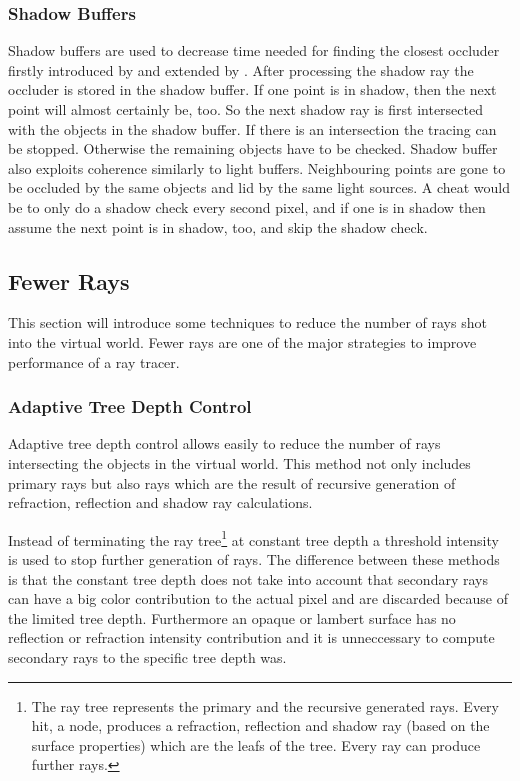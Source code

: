 \documentclass[DIV10, abstracton, openright, footsepline, headsepline, twoside, 9pt,
bigheadings]{scrreprt}
\begin{document}
\subsubsection{Shadow Buffers}
Shadow buffers are used to decrease time needed for finding the closest
occluder firstly introduced by \cite{light-buffer} and extended by
\cite{shadow-buffer}. After processing the  shadow ray the occluder is stored in
the shadow buffer.
If one point is in shadow, then the next point will almost certainly be,
too. So the next shadow ray is first intersected with the objects in the shadow
buffer. If there is an intersection the tracing can be stopped. Otherwise the
remaining objects have to be checked. Shadow buffer also exploits coherence
similarly to light buffers. Neighbouring points are gone to be occluded by the
same objects and lid by the same light sources. A cheat would be to only do a
shadow check every second pixel, and if one is in shadow then assume the next
point is in shadow, too, and skip the shadow check.

\subsection{Fewer Rays}
This section will introduce some techniques to reduce the number of rays
shot into the virtual world. Fewer rays are one of the major strategies
to improve performance of a ray tracer.

\subsubsection{Adaptive Tree Depth Control}
Adaptive tree depth control allows easily to reduce the number of rays
intersecting the objects in the virtual world. This method not only includes
primary rays but also rays which are the result of recursive generation of
refraction, reflection and shadow ray calculations.

Instead of terminating the ray tree\footnote[1]{The ray tree represents the
primary and the recursive generated rays. Every hit, a node, produces a
refraction, reflection and shadow ray (based on the surface properties) which
are the leafs of the tree. Every ray can produce further rays. }
 at constant tree depth a threshold intensity is
used to stop further generation of rays. The difference between these methods
is that the constant tree depth does not take into account that secondary rays
can have a big color contribution to the actual pixel and are discarded because
of the limited tree depth. Furthermore an opaque or lambert surface has no
reflection or refraction intensity contribution and it is unneccessary to
compute secondary rays to the specific tree depth was.
\end{document}
